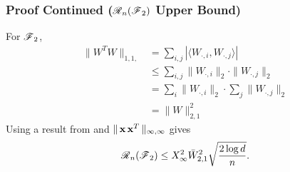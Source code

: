 \begin{frame}
\frametitle{Proof Continued ($\operatorname{\mathscr{R}}_n(\operatorname{\mathscr{F}}_2)$ Upper Bound)}
For $\operatorname{\mathscr{F}}_2$,
\begin{align*}
\|W^TW\|_{1,1,} &= \sum_{i,j} |\langle W_{\cdot,i},   W_{\cdot,j}\rangle| \\
  &\le \sum_{i,j} \|W_{\cdot,i}\|_2 \cdot \|W_{\cdot,j}\|_2 \\
  &= \sum_i \|W_{\cdot,i}\|_2 \cdot \sum_j \|W_{\cdot,j}\|_2 \\
  &= \|W\|_{2,1}^2
\end{align*}
Using a result from \cite{kakade2009complexity} and $\|\operatorname{\mathbf{x}}\operatorname{\mathbf{x}}^T\|_{\infty,\infty}$ gives
\[\operatorname{\mathscr{R}}_n(\operatorname{\mathscr{F}}_2) \le X_\infty^2 \bar{W}_{2,1}^2 \sqrt{\frac{2\log d}{n}}.\]
\end{frame}


